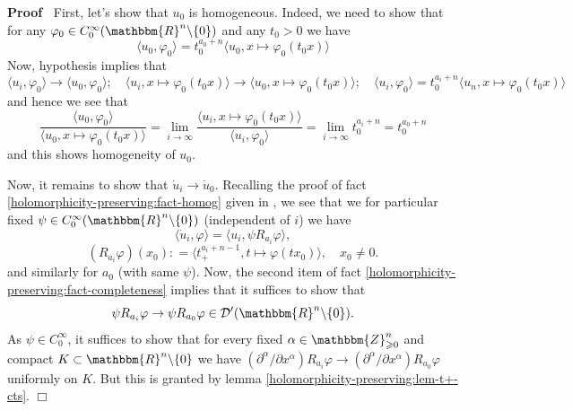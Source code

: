 \documentclass{article}
\newenvironment{proof}{\noindent\textbf{Proof\ }}{\hspace*{\fill}$\Box$\medskip}
\numberwithin{definition}{section}
\numberwithin{lemma}{section}
\numberwithin{proposition}{section}
{\theorembodyfont{\rmfamily}\newtheorem{remark}{Remark}
\numberwithin{remark}{section}
}
\begin{document}
\begin{proof}
  First, let's show that $u_0$ is homogeneous. Indeed, we need to show that
  for any $\varphi_0 \in C_0^{\infty} ( \mathbbm{R}^n \backslash \{ 0 \})$ and
  any $t_0 > 0$ we have
  \[ \langle u_0, \varphi_0 \rangle = t_0^{a_0 + n} \langle u_0, x \mapsto
     \varphi_0 ( t_0 x) \rangle \]
  Now, hypothesis implies that
  \[ \langle u_i, \varphi_0 \rangle \rightarrow \langle u_0, \varphi_0 \rangle
     ; \hspace{1em} \langle u_i, x \mapsto \varphi_0 ( t_0 x) \rangle
     \rightarrow \langle u_0, x \mapsto \varphi_0 ( t_0 x) \rangle ;
     \hspace{1em} \langle u_i, \varphi_0 \rangle = t_0^{a_i + n} \langle u_n,
     x \mapsto \varphi_0 ( t_0 x) \rangle \]
  and hence we see that
  \[ \frac{\langle u_0, \varphi_0 \rangle}{\langle u_0, x \mapsto \varphi_0 (
     t_0 x) \rangle} = \lim_{i \rightarrow \infty} \frac{\langle u_i, x
     \mapsto \varphi_0 ( t_0 x) \rangle}{\langle u_i, \varphi_0 \rangle} =
     \lim_{i \rightarrow \infty} t_0^{a_i + n} = t_0^{a_0 + n} \]
  and this shows homogeneity of $u_0$.
  
  Now, it remains to show that $\dot{u}_i \rightarrow \dot{u}_0$. Recalling
  the proof of fact \ref{holomorphicity-preserving:fact-homog} given in
  {\cite{hormander1983analysis}}, we see that we for particular fixed $\psi
  \in C_0^{\infty} ( \mathbbm{R}^n \backslash \{ 0 \})$ (independent of $i$)
  we have
  \[ \langle \dot{u}_i, \varphi \rangle = \langle u_i, \psi R_{a_i} \varphi
     \rangle, \]
  \[ ( R_{a_i} \varphi) ( x_0) : = \langle t_+^{a_i + n - 1}, t \mapsto
     \varphi ( t x_0) \rangle, \hspace{1em} x_0 \neq 0. \]
  and similarly for $a_0$ (with same $\psi$). Now, the second item of fact
  \ref{holomorphicity-preserving:fact-completeness} implies that it suffices
  to show that
  \[ \psi R_{a_i} \varphi \rightarrow \psi R_{a_0} \varphi \in \mathcal{D}' (
     \mathbbm{R}^n \backslash \{ 0 \}) . \]
  As $\psi \in C_0^{\infty}$, it suffices to show that for every fixed $\alpha
  \in \mathbbm{Z}_{\geqslant 0}^n$ and compact $K \subset \mathbbm{R}^n
  \backslash \{ 0 \}$ we have $( \partial^{\alpha} / \partial x^{\alpha})
  R_{a_i} \varphi \rightarrow ( \partial^{\alpha} / \partial x^{\alpha})
  R_{a_0} \varphi$ uniformly on $K$. But this is granted by lemma
  \ref{holomorphicity-preserving:lem-t+-cts}.
\end{proof}
\end{document}
